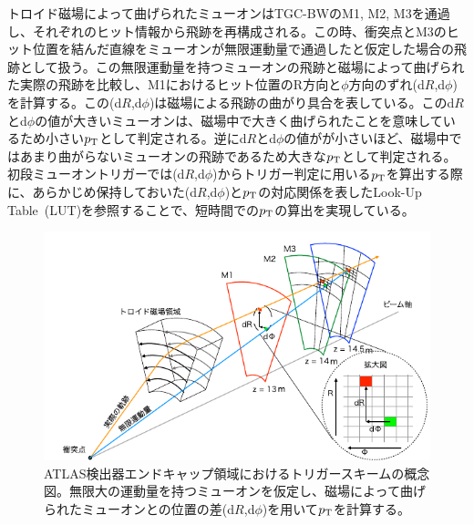 トロイド磁場によって曲げられたミューオンはTGC-BWのM1, M2, M3を通過し、それぞれのヒット情報から飛跡を再構成される。この時、衝突点とM3のヒット位置を結んだ直線をミューオンが無限運動量で通過したと仮定した場合の飛跡として扱う。この無限運動量を持つミューオンの飛跡と磁場によって曲げられた実際の飛跡を比較し、M1におけるヒット位置のR方向と$\phi$方向のずれ(d$R$,d$\phi$)を計算する。この(d$R$,d$\phi$)は磁場による飛跡の曲がり具合を表している。このd$R$とd$\phi$の値が大きいミューオンは、磁場中で大きく曲げられたことを意味しているため小さい$p_{\rm{T}}$として判定される。逆にd$R$とd$\phi$の値がが小さいほど、磁場中ではあまり曲がらないミューオンの飛跡であるため大きな$p_{\rm{T}}$として判定される。
初段ミューオントリガーでは(d$R$,d$\phi$)からトリガー判定に用いる$p_{\rm{T}}$を算出する際に、あらかじめ保持しておいた(d$R$,d$\phi$)と$p_{\rm{T}}$の対応関係を表したLook-Up Table~(LUT)を参照することで、短時間での$p_{\rm{T}}$の算出を実現している。

\begin{figure}[tb]
  \centering
  \includegraphics[clip, width=15cm]{fig/3/akatuka_mt_trigger_sceme.pdf}
  \caption{ATLAS検出器エンドキャップ領域におけるトリガースキームの概念図\cite{article:akatsuka-mron}。無限大の運動量を持つミューオンを仮定し、磁場によって曲げられたミューオンとの位置の差(d$R$,d$\phi$)を用いて$p_{\rm{T}}$を計算する。}
  \label{fig:trigger-scheme}
\end{figure}


